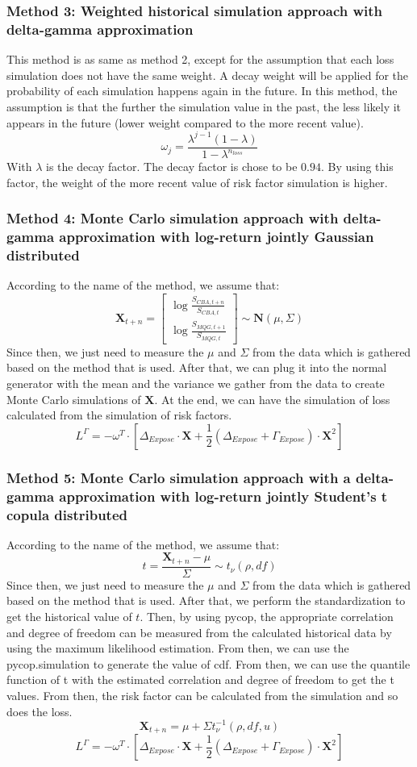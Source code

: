 \subsubsection{Method 3: Weighted historical simulation approach with delta-gamma approximation}
This method is as same as method 2, except for the assumption that each loss simulation does not have the same weight. A decay weight will be applied for the probability of each simulation happens again in the future. In this method, the assumption is that the further the simulation value in the past, the less likely it appears in the future (lower weight compared to the more recent value).
\[
\omega_j=\frac{\lambda^{j-1}(1-\lambda)}{1-\lambda^{n_{loss}}}
\]
With \(\lambda\) is the decay factor. The decay factor is chose to be \(0.94\). By using this factor, the weight of the more recent value of risk factor simulation is higher.
\subsubsection{Method 4: Monte Carlo simulation approach with delta-gamma approximation with log-return jointly Gaussian distributed}
According to the name of the method, we assume that:
\[
\mathbf{X}_{t+n}=\begin{bmatrix} \log \frac{S_{CBA,t+n}}{S_{CBA,t}} \\ \log \frac{S_{MQG,t+1}}{S_{MQG,t}}  \end{bmatrix}\sim\mathbf{N}(\mu, \Sigma)
\]
Since then, we just need to measure the \(\mu\) and \(\Sigma\) from the data which is gathered based on the method that is used. After that, we can plug it into the normal generator with the mean and the variance we gather from the data to create Monte Carlo simulations of \(\mathbf{X}\). At the end, we can have the simulation of loss calculated from the simulation of risk factors.
\[
L^\Gamma=-\omega^T\cdot\left[\Delta_{Expose}\cdot \mathbf{X}+\frac{1}{2}\left(\Delta_{Expose}+\Gamma_{Expose}\right)\cdot\mathbf{X}^2\right]
\]
\subsubsection{Method 5: Monte Carlo simulation approach with a delta-gamma approximation with log-return jointly Student's t copula distributed}
According to the name of the method, we assume that:
\[
t=\frac{\mathbf{X}_{t+n}-\mu}{\Sigma}\sim t_\nu(\rho,df)
\]
Since then, we just need to measure the \(\mu\) and \(\Sigma\) from the data which is gathered based on the method that is used. After that, we perform the standardization to get the historical value of \(t\). Then, by using pycop, the appropriate correlation and degree of freedom can be measured from the calculated historical data by using the maximum likelihood estimation. From then, we can use the pycop.simulation to generate the value of cdf. From then, we can use the quantile function of t with the estimated correlation and degree of freedom to get the t values. From then, the risk factor can be calculated from the simulation and so does the loss.
\[
\mathbf{X}_{t+n}=\mu+\Sigma t_\nu^{-1}(\rho, df, u)
\]
\[
L^\Gamma=-\omega^T\cdot\left[\Delta_{Expose}\cdot \mathbf{X}+\frac{1}{2}\left(\Delta_{Expose}+\Gamma_{Expose}\right)\cdot\mathbf{X}^2\right]
\]